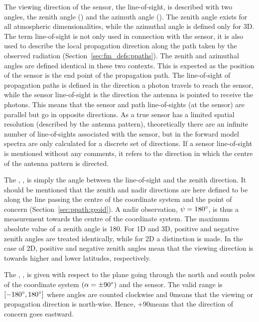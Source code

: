 \label{sec:fm_defs:los}

The viewing direction of the sensor, the line-of-sight, is described
with two angles, the zenith angle (\ZntAng) and the azimuth angle
(\AzmAng). The zenith angle exists for all atmospheric
dimensionalities, while the azimuthal angle is defined only for 3D.
The term line-of-sight is not only used in connection with the sensor,
it is also used to describe the local propagation direction along the
path taken by the observed radiation (Section~\ref{sec:fm_defs:ppaths}).
The zenith and azimuthal angles are defined identical in these two
contexts. This is expected as the position of the sensor is the end
point of the propagation path. The line-of-sight of propagation paths
is defined in the direction a photon travels to reach the sensor,
while the sensor line-of-sight is the direction the antenna is pointed
to receive the photons. This means that the sensor and path
line-of-sights (at the sensor) are parallel but go in opposite
directions. As a true sensor has a limited spatial resolution
(described by the antenna pattern), theoretically there are an
infinite number of line-of-sights associated with the sensor, but in
the forward model spectra are only calculated for a discrete set of
directions. If a sensor line-of-sight is mentioned without any
comments, it refers to the direction in which the centre of the
antenna pattern is directed.

The , \ZntAng, is simply the angle between the
line-of-sight and the zenith direction. It should be mentioned that
the zenith and nadir directions are here defined to be along the line
passing the centre of the coordinate system and the point of concern
(Section~\ref{sec:ppath:geoid}). A nadir observation,
$\psi=180^\circ$, is thus a measurement towards the centre of the
coordinate system. The maximum absolute value of a zenith angle is
180\degree. For 1D and 3D, positive and negative zenith angles are
treated identically, while for 2D a distinction is made. In the case
of 2D, positive and negative zenith angles mean that the viewing
direction is towards higher and lower latitudes, respectively.

The , \AzmAng, is given with respect to the
plane going through the north and south poles of the coordinate system
$(\alpha=\pm90^\circ)$ and the sensor. The valid range is
$[-180^\circ,180^\circ]$ where angles are counted clockwise and
0\degree means that the viewing or propagation direction is north-wise.
Hence, +90\degree means that the direction of concern goes eastward.

